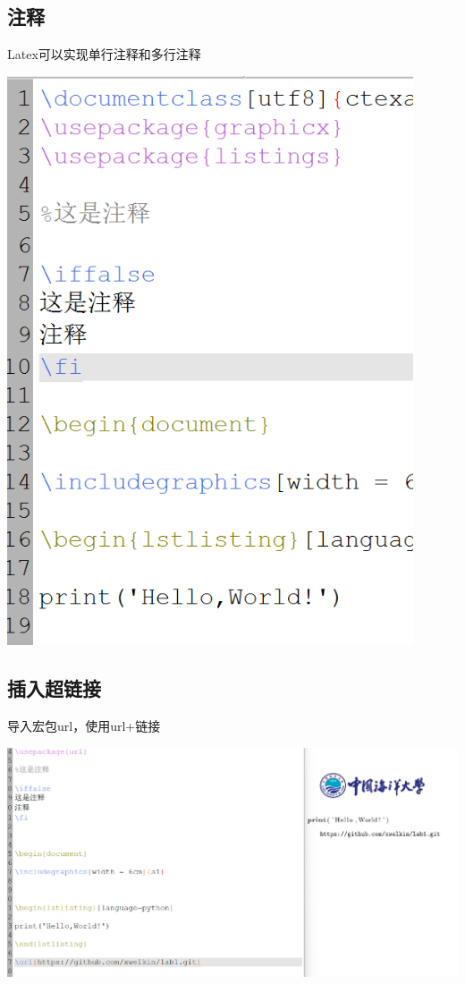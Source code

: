 \documentclass[UTF8,a4paper]{ctexart}
\begin{document}
\begin{sloppypar}
	\subsection{注释}
	Latex可以实现单行注释和多行注释
	
	\includegraphics[width = 12cm]{18}
	
	\subsection{插入超链接}
	导入宏包url，使用url+链接
	
	\includegraphics[width = 16cm]{19}
	

\end{sloppypar}
\end{document}
